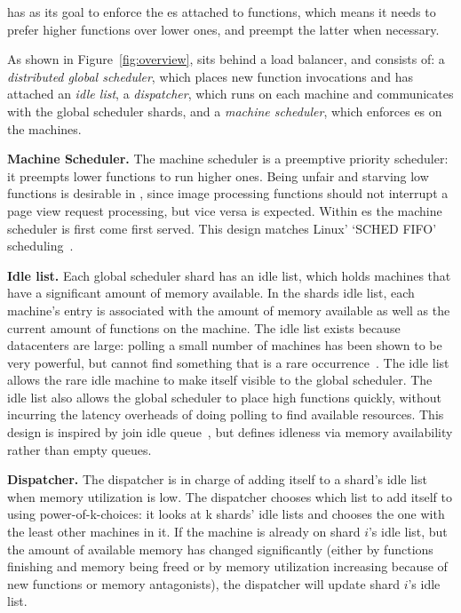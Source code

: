 \Sys{} has as its goal to enforce the \class{}es attached to functions, which
means it needs to prefer higher \class{} functions over lower ones, and preempt
the latter when necessary.
  

As shown in Figure~\ref{fig:overview}, \sys{} sits behind a load balancer, and
consists of: a \textit{distributed global scheduler}, which places new function
invocations and has attached an \textit{idle list}, a \textit{dispatcher},
which runs on each machine and communicates with the global scheduler shards,
and a \textit{machine scheduler}, which enforces \class{}es on the machines.


\textbf{Machine Scheduler.}
The machine scheduler is a preemptive priority scheduler: it preempts lower
\class{} functions to run higher \class{} ones. Being unfair and starving low
\class{} functions is desirable in \sys{}, since image processing functions
should not interrupt a page view request processing, but vice versa is expected.
Within \class{}es the machine scheduler is first come first served. This design
matches Linux' `SCHED FIFO' scheduling~\cite{linux-sched}.


\textbf{Idle list.}
Each global scheduler shard has an idle list, which holds machines that have a
significant amount of memory available. In the shards idle list, each machine's
entry is associated with the amount of memory available as well as the current
amount of functions on the machine. The idle list exists because datacenters are
large: polling a small number of machines has been shown to be very powerful,
but cannot find something that is a rare occurrence~\cite{join-idle-queue}. The
idle list allows the rare idle machine to make itself visible to the global
scheduler. The idle list also allows the global scheduler to place high \class{}
functions quickly, without incurring the latency overheads of doing polling to
find available resources. This design is inspired by join idle
queue~\cite{join-idle-queue}, but defines idleness via memory availability
rather than empty queues.


\textbf{Dispatcher.}
The dispatcher is in charge of adding itself to a shard's idle list when memory
utilization is low. The dispatcher chooses which list to add itself to using
power-of-k-choices: it looks at k shards' idle lists and chooses the one with
the least other machines in it. If the machine is already on shard $i$'s idle
list, but the amount of available memory has changed significantly (either by
functions finishing and memory being freed or by memory utilization increasing
because of new functions or memory antagonists), the dispatcher will update
shard $i$'s idle list.

